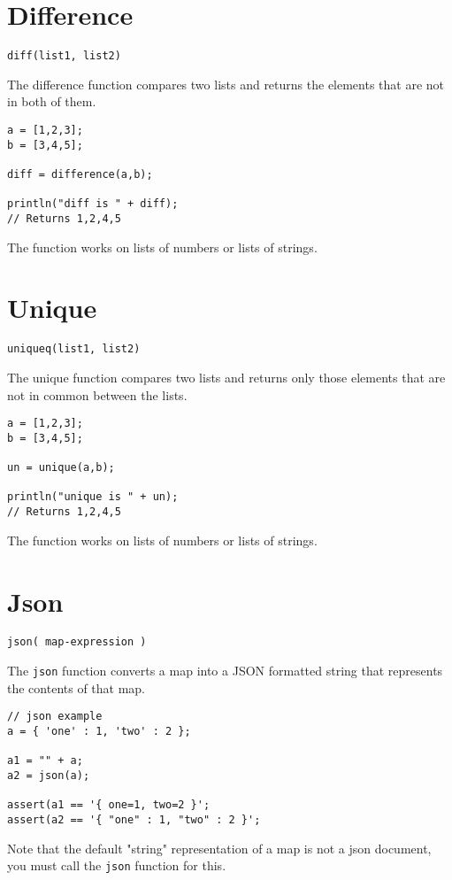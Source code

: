 \section{Difference}
\begin{Verbatim}
diff(list1, list2)
\end{Verbatim}
The difference function compares two lists and returns the elements that are not in both of them.
\begin{lstlisting}[caption={Difference example}]
a = [1,2,3];
b = [3,4,5];

diff = difference(a,b);

println("diff is " + diff);
// Returns 1,2,4,5
\end{lstlisting}
The function works on lists of numbers or lists of strings.
\section{Unique}
\begin{Verbatim}
uniqueq(list1, list2)
\end{Verbatim}
The unique function compares two lists and returns only those elements that are not in common between the lists.
\begin{lstlisting}[caption={Unique example}]
a = [1,2,3];
b = [3,4,5];

un = unique(a,b);

println("unique is " + un);
// Returns 1,2,4,5
\end{lstlisting}
The function works on lists of numbers or lists of strings.
\section{Json}
\begin{Verbatim}
json( map-expression )
\end{Verbatim}

The \Verb+json+ function converts a map into a JSON formatted string that represents the contents of that map.

\begin{lstlisting}[caption={Json example}]
// json example
a = { 'one' : 1, 'two' : 2 };

a1 = "" + a;
a2 = json(a);

assert(a1 == '{ one=1, two=2 }';
assert(a2 == '{ "one" : 1, "two" : 2 }';
\end{lstlisting}

Note that the default "string" representation of a map is not a json document, you must call the \Verb+json+ function for this.

